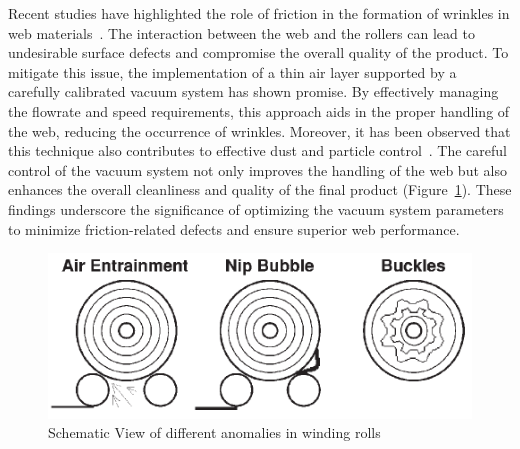 Recent studies have highlighted the role of friction in the formation of wrinkles in web materials~\cite{Hashimoto2007PredictionMO}. The interaction between the web and the rollers can lead to undesirable surface defects and compromise the overall quality of the product. To mitigate this issue, the implementation of a thin air layer supported by a carefully calibrated vacuum system has shown promise. By effectively managing the flowrate and speed requirements, this approach aids in the proper handling of the web, reducing the occurrence of wrinkles. Moreover, it has been observed that this technique also contributes to effective dust and particle control~\cite{Xu2016}. The careful control of the vacuum system not only improves the handling of the web but also enhances the overall cleanliness and quality of the final product (Figure~\ref{roll1}). These findings underscore the significance of optimizing the vacuum system parameters to minimize friction-related defects and ensure superior web performance. 
%
\begin{figure}[H]
    \centering
    \includegraphics[width=0.5\linewidth]{FIGURES/Roll1.png}
    \caption{Schematic View of different anomalies in winding rolls~\cite{rosiumconference}}
    \label{roll1}
\end{figure}

